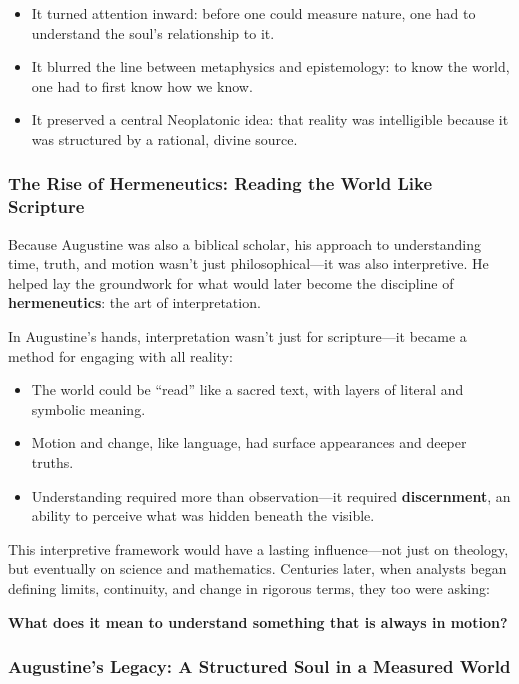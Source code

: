 \begin{itemize}
    \item It turned attention inward: before one could measure nature, one had to understand the soul’s relationship to it.
    \item It blurred the line between metaphysics and epistemology: to know the world, one had to first know how we know.
    \item It preserved a central Neoplatonic idea: that reality was intelligible because it was structured by a rational, divine source.
\end{itemize}

\subsubsection{The Rise of Hermeneutics: Reading the World Like Scripture}

Because Augustine was also a biblical scholar, his approach to understanding time, truth, and motion wasn’t just philosophical—it was also interpretive. He helped lay the groundwork for what would later become the discipline of \textbf{hermeneutics}: the art of interpretation.

In Augustine’s hands, interpretation wasn’t just for scripture—it became a method for engaging with all reality:

\begin{itemize}
    \item The world could be “read” like a sacred text, with layers of literal and symbolic meaning.
    \item Motion and change, like language, had surface appearances and deeper truths.
    \item Understanding required more than observation—it required \textbf{discernment}, an ability to perceive what was hidden beneath the visible.
\end{itemize}

This interpretive framework would have a lasting influence—not just on theology, but eventually on science and mathematics. Centuries later, when analysts began defining limits, continuity, and change in rigorous terms, they too were asking:  

\textbf{What does it mean to understand something that is always in motion?}

\subsubsection{Augustine’s Legacy: A Structured Soul in a Measured World}

